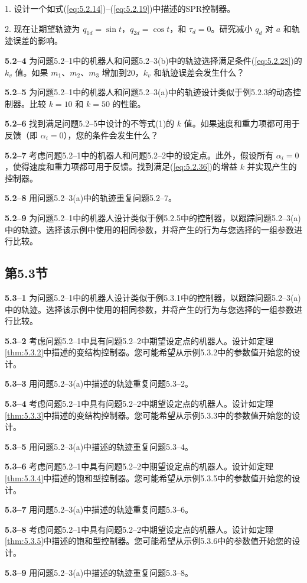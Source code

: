 \documentclass[UTF8,12pt,a4paper]{ctexart}
\begin{document}
1. 设计一个如式(\ref{eq:5.2.14})--(\ref{eq:5.2.19})中描述的SPR控制器。

2. 现在让期望轨迹为 $q_{1d} = \sin t$，$q_{2d} = \cos t$，和 $\tau_d = 0$。研究减小 $q_d$ 对 $a$ 和轨迹误差的影响。

\textbf{5.2--4} 为问题5.2--1中的机器人和问题5.2--3(b)中的轨迹选择满足条件(\ref{eq:5.2.28})的 $k_v$ 值。如果 $m_1$、$m_2$、$m_3$ 增加到20，$k_v$ 和轨迹误差会发生什么？

\textbf{5.2--5} 为问题5.2--1中的机器人和问题5.2--3(a)中的轨迹设计类似于例5.2.3的动态控制器。比较 $k = 10$ 和 $k = 50$ 的性能。

\textbf{5.2--6} 找到满足问题5.2--5中设计的不等式(1)的 $k$ 值。如果速度和重力项都可用于反馈（即 $\alpha_i = 0$），您的条件会发生什么？

\textbf{5.2--7} 考虑问题5.2--1中的机器人和问题5.2--2中的设定点。此外，假设所有 $\alpha_i = 0$，使得速度和重力项都可用于反馈。找到满足(\ref{eq:5.2.36})的增益 $k$ 并实现产生的控制器。

\textbf{5.2--8} 用问题5.2--3(a)中的轨迹重复问题5.2--7。

\textbf{5.2--9} 为问题5.2--1中的机器人设计类似于例5.2.5中的控制器，以跟踪问题5.2--3(a)中的轨迹。选择该示例中使用的相同参数，并将产生的行为与您选择的一组参数进行比较。

\subsection*{第5.3节}

\textbf{5.3--1} 为问题5.2--1中的机器人设计类似于例5.3.1中的控制器，以跟踪问题5.2--3(a)中的轨迹。选择该示例中使用的相同参数，并将产生的行为与您选择的一组参数进行比较。

\textbf{5.3--2} 考虑问题5.2--1中具有问题5.2--2中期望设定点的机器人。设计如定理\ref{thm:5.3.2}中描述的变结构控制器。您可能希望从示例5.3.2中的参数值开始您的设计。

\textbf{5.3--3} 用问题5.2--3(a)中描述的轨迹重复问题5.3--2。

\textbf{5.3--4} 考虑问题5.2--1中具有问题5.2--2中期望设定点的机器人。设计如定理\ref{thm:5.3.3}中描述的变结构控制器。您可能希望从示例5.3.3中的参数值开始您的设计。

\textbf{5.3--5} 用问题5.2--3(a)中描述的轨迹重复问题5.3--4。

\textbf{5.3--6} 考虑问题5.2--1中具有问题5.2--2中期望设定点的机器人。设计如定理\ref{thm:5.3.4}中描述的饱和型控制器。您可能希望从示例5.3.5中的参数值开始您的设计。

\textbf{5.3--7} 用问题5.2--3(a)中描述的轨迹重复问题5.3--6。

\textbf{5.3--8} 考虑问题5.2--1中具有问题5.2--2中期望设定点的机器人。设计如定理\ref{thm:5.3.5}中描述的饱和型控制器。您可能希望从示例5.3.6中的参数值开始您的设计。

\textbf{5.3--9} 用问题5.2--3(a)中描述的轨迹重复问题5.3--8。
\end{document}
